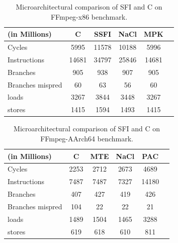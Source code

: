 \begin{table}[!htbp]
    \begin{small}
    \begin{center}
  \begin{tabular}{| l | c | c | c | c | c |}
  \hline
  (in Millions)    & C   & SSFI   & NaCl & MPK   \\
  \hline
  \hline
  Cycles           & 5995 & 11578  & 10188 & 5996  \\
  Instructions     & 14681  & 34797  & 25846 & 14681 \\
  Branches         & 905   & 938   & 907  & 905   \\
  Branches mispred & 60   & 63    & 56   & 60    \\
  loads            & 3267  & 3844  & 3448 & 3267  \\
  stores           & 1415  & 1594   & 1493  & 1415   \\
  \hline
  \end{tabular}
  \end{center}
\end{small}
  \caption{Microarchitectural comparison of SFI and C on FFmpeg-x86 benchmark.}
  \label{table:micro-ffmpeg-x86}
  \end{table}


\begin{table}[!htbp]
    \begin{small}
    \begin{center}
  \begin{tabular}{| l | c | c | c | c | c |}
  \hline
  (in Millions)    & C   & MTE   & NaCl & PAC   \\
  \hline
  \hline
  Cycles           & 2253 & 2712  & 2673 & 4689  \\
  Instructions     & 7487  & 7487  & 7327 & 14180 \\
  Branches         & 407   & 427   & 419  & 426   \\
  Branches mispred & 104   & 22    & 22   & 21    \\
  loads            & 1489  & 1504  & 1465 & 3288  \\
  stores           & 619  & 618   & 610  & 811   \\
  \hline
  \end{tabular}
  \end{center}
\end{small}
  \caption{Microarchitectural comparison of SFI and C on FFmpeg-AArch64 benchmark.}
  \label{table:micro-ffmpeg-arm}
  \end{table}
